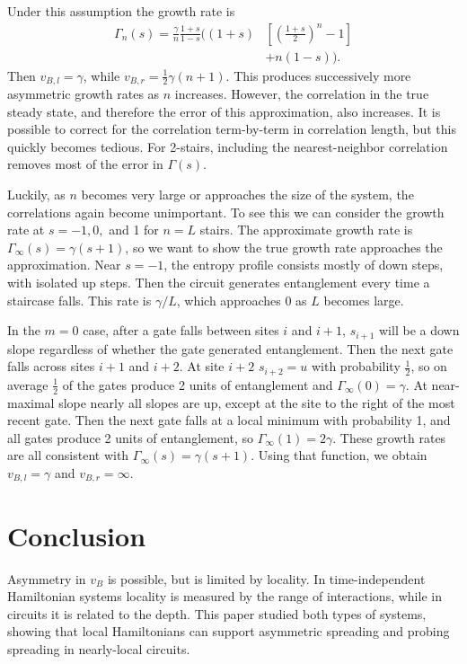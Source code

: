 \documentclass[aps,prx,reprint,superscriptaddress, longbibliography]{revtex4-1}
\newcommand{\half}{\frac{1}{2}}
\begin{document}
Under this assumption the growth rate is
\begin{align}
\Gamma_n(s) = \frac{\gamma}{n}\frac{1+s}{1-s}\bigg(
	(1+s)&\left[\left(\frac{1+s}{2}\right)^n-1\right]\nonumber \\
	&+n(1-s)\bigg). \label{eqn:growthrate}
\end{align}
Then $v_{B,l}=\gamma$, while $v_{B,r}=\half\gamma(n+1)$.
This produces successively more asymmetric growth rates as $n$ increases. However, the correlation in the true steady state, and therefore the error of this approximation, also increases. It is possible to correct for the correlation term-by-term in correlation length, but this quickly becomes tedious. For 2-stairs, including the nearest-neighbor correlation removes most of the error in $\Gamma(s)$.

Luckily, as $n$ becomes very large or approaches the size of the system, the correlations again become unimportant. To see this we can consider the growth rate at $s = -1, 0,$ and 1 for $n=L$ stairs. The approximate growth rate is $\Gamma_\infty(s)=\gamma(s+1)$, so we want to show the true growth rate approaches the approximation. Near $s=-1$, the entropy profile consists mostly of down steps, with isolated up steps. Then the circuit generates entanglement every time a staircase falls. This rate is $\gamma/L$, which approaches 0 as $L$ becomes large.

In the $m = 0$ case, after a gate falls between sites $i$ and $i + 1$, $s_{i+1}$ will be a down slope regardless of whether the gate generated entanglement. Then the next gate falls across sites $i + 1$ and $i+2$. At site $i+2$ $s_{i+2} = u$ with probability $\half$, so on average $\half$ of the gates produce 2 units of entanglement and $\Gamma_\infty(0)=\gamma$. At near-maximal slope nearly all slopes are up, except at the site to the right of the most recent gate. Then the next gate falls at a local minimum with probability 1, and all gates produce 2 units of entanglement, so $\Gamma_\infty(1)=2\gamma$. These growth rates are all consistent with $\Gamma_\infty(s)=\gamma(s+1)$. Using that function, we obtain $v_{B,l}=\gamma$ and $v_{B,r}=\infty$.

\section{Conclusion}

Asymmetry in $v_B$ is possible, but is limited by locality. In time-independent Hamiltonian systems locality is measured by the range of interactions, while in circuits it is related to the depth. This paper studied both types of systems, showing that local Hamiltonians can support asymmetric spreading and probing spreading in nearly-local circuits. 
\end{document}
